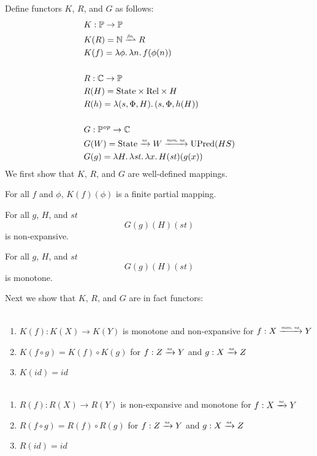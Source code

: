 \documentclass[a4paper]{article}
\newcommand{\forcenewline}{$\phantom{v}$\\}
\newcommand{\finparfun}{\xrightharpoonup{\textit{\tiny{fin}}}}
\newcommand{\monnefun}{\xrightarrow{\textit{\tiny{mon, ne}}}}
\newcommand{\nefun}{\xrightarrow{\textit{\tiny{ne}}}}
\newcommand{\id}{\var{id}}
\newcommand{\CatC}{\mathbb{C}}
\newcommand{\CatP}{\mathbb{P}}
\newcommand{\var}[1]{\mathit{#1}}
\newcommand{\plaindom}[1]{\mathrm{#1}}
\newcommand{\nats}{\mathbb{N}}
\newcommand{\Rel}{\plaindom{Rel}}
\newcommand{\States}{\plaindom{State}}
\newcommand{\UPred}[1]{\plaindom{UPred}(#1)}
\begin{document}
Define functors $K$, $R$, and $G$ as follows:
\begin{align*}
  & K : \CatP \rightarrow \CatP \\
  & K(R) = \nats \finparfun R \\
  & K(f) = \lambda \phi \ldotp \lambda n \ldotp f(\phi(n)) \\
  & \\
  & R : \CatC \rightarrow \CatP \\
  & R(H) = \States \times \Rel \times H\\
  & R(h) = \lambda (s,\Phi,H) \ldotp (s,\Phi,h(H))\\
  & \\
  & G : \CatP^{\var{op}} \rightarrow \CatC \\
  & G(W) = \States \nefun W \monnefun \UPred{HS} \\
  & G(g) = \lambda H \ldotp \lambda \var{st} \ldotp \lambda x \ldotp H (\var{st})(g(x))
\end{align*}
We first show that $K$, $R$, and $G$ are well-defined mappings.
\begin{lemma}
  \label{lem:world-finpar}
  For all $f$ and $\phi$, $K(f)(\phi)$ is a finite partial mapping.
\end{lemma}
\begin{lemma}
\label{lem:HSP-mon}
For all $g$, $H$, and $\var{st}$
\[
G(g) (H) (\var{st})
\]
is non-expansive.
\end{lemma}
\begin{lemma}
\label{lem:HSP-ne}
For all $g$, $H$, and $\var{st}$
\[
G(g) (H) (\var{st})
\]
is monotone.
\end{lemma}
Next we show that $K$, $R$, and $G$ are in fact functors:
\begin{lemma}[$K$ functorial]\forcenewline
\label{lem:K-func}
  \begin{enumerate}
  \item $K(f) : K(X) \rightarrow K(Y)$ is monotone and non-expansive for $f : X \monnefun Y$
  \item $K(f \circ g) = K(f) \circ K(g)$ for $f : Z \nefun Y$ and $g : X \nefun Z$
  \item $K(\id) = \id$
  \end{enumerate}
\end{lemma}

\begin{lemma}[$R$ functorial]\forcenewline
\label{lem:R-func}
  \begin{enumerate}
  \item $R(f) : R(X) \rightarrow R(Y)$ is non-expansive and monotone for $f : X \nefun Y$
  \item $R(f \circ g) = R(f) \circ R(g)$ for $f : Z \nefun Y$ and $g : X \nefun Z$
  \item $R(\id) = \id$
  \end{enumerate}
\end{lemma}
\end{document}
